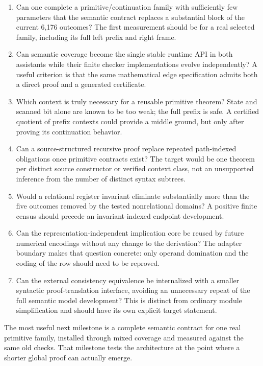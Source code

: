 \documentclass[11pt]{article}
\begin{document}
\begin{enumerate}
\item Can one complete a primitive/continuation family with sufficiently few parameters that the semantic contract replaces a substantial block of the current 6,176 outcomes? The first measurement should be for a real selected family, including its full left prefix and right frame.
\item Can semantic coverage become the single stable runtime API in both assistants while their finite checker implementations evolve independently? A useful criterion is that the same mathematical edge specification admits both a direct proof and a generated certificate.
\item Which context is truly necessary for a reusable primitive theorem? State and scanned bit alone are known to be too weak; the full prefix is safe. A certified quotient of prefix contexts could provide a middle ground, but only after proving its continuation behavior.
\item Can a source-structured recursive proof replace repeated path-indexed obligations once primitive contracts exist? The target would be one theorem per distinct source constructor or verified context class, not an unsupported inference from the number of distinct syntax subtrees.
\item Would a relational register invariant eliminate substantially more than the five outcomes removed by the tested nonrelational domains? A positive finite census should precede an invariant-indexed endpoint development.
\item Can the representation-independent implication core be reused by future numerical encodings without any change to the derivation? The adapter boundary makes that question concrete: only operand domination and the coding of the row should need to be reproved.
\item Can the external consistency equivalence be internalized with a smaller syntactic proof-translation interface, avoiding an unnecessary repeat of the full semantic model development? This is distinct from ordinary module simplification and should have its own explicit target statement.
\end{enumerate}

The most useful next milestone is a complete semantic contract for one real primitive family, installed through mixed coverage and measured against the same old checks. That milestone tests the architecture at the point where a shorter global proof can actually emerge.
\end{document}
